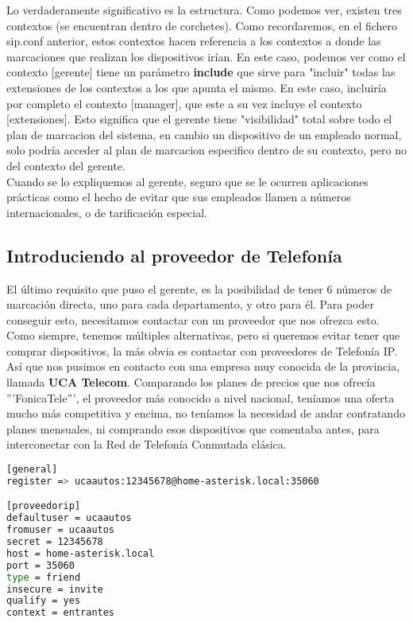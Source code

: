 Lo verdaderamente significativo es la estructura. Como podemos ver, existen tres contextos (se encuentran dentro de corchetes). Como recordaremos, en el fichero sip.conf anterior, estos contextos hacen referencia a los contextos a donde las marcaciones que realizan los dispositivos irían. En este caso, podemos ver como el contexto [gerente] tiene un parámetro \textbf{include} que sirve para "incluir" todas las extensiones de los contextos a los que apunta el mismo. En este caso, incluiría por completo el contexto [manager], que este a su vez incluye el contexto [extensiones]. Esto significa que el gerente tiene "visibilidad" total sobre todo el plan de marcacion del sistema, en cambio un dispositivo de un empleado normal, solo podría acceder al plan de marcacion especifico dentro de su contexto, pero no del contexto del gerente.\\

Cuando se lo expliquemos al gerente, seguro que se le ocurren aplicaciones prácticas como el hecho de evitar que sus empleados llamen a números internacionales, o de tarificación especial.

\subsection{Introduciendo al proveedor de Telefonía}

El último requisito que puso el gerente, es la posibilidad de tener 6 números de marcación directa, uno para cada departamento, y otro para él. Para poder conseguir esto, necesitamos contactar con un proveedor que nos ofrezca esto.\\

Como siempre, tenemos múltiples alternativas, pero si queremos evitar tener que comprar dispositivos, la más obvia es contactar con proveedores de Telefonía IP. Así que nos pusimos en contacto con una empresa muy conocida de la provincia, llamada \textbf{UCA Telecom}. Comparando los planes de precios que nos ofrecía '''FonicaTele''', el proveedor más conocido a nivel nacional, teníamos una oferta mucho más competitiva y encima, no teníamos la necesidad de andar contratando planes mensuales, ni comprando esos dispositivos que comentaba antes, para interconectar con la Red de Telefonía Conmutada clásica.

\begin{lstlisting}[language=bash,title={/etc/asterisk/sip.conf}]
[general]
register => ucaautos:12345678@home-asterisk.local:35060

[proveedorip]
defaultuser = ucaautos
fromuser = ucaautos
secret = 12345678
host = home-asterisk.local
port = 35060
type = friend
insecure = invite
qualify = yes
context = entrantes
\end{lstlisting}

